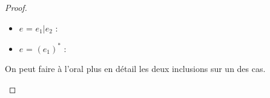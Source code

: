 \begin{proof}
\begin{enumerate}
\begin{itemize}[label=$\star$]
			\item $e$ = $e_{1} | e_{2}$ :
			\item $e$ = $(e_{1})^{*}$ :
		\end{itemize} 
		 
		 \begin{com}
		 	On peut faire à l'oral plus en détail les deux inclusions sur un des cas.
		 \end{com}
	 

\end{enumerate}
\end{proof}
